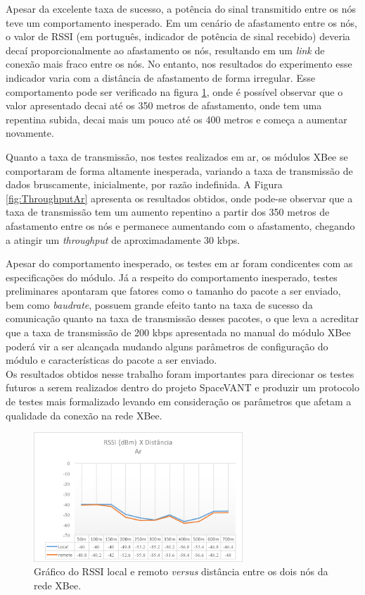 Apesar da excelente taxa de sucesso, a potência do sinal transmitido entre os nós teve um comportamento inesperado. Em um cenário de afastamento entre os nós, o valor de RSSI (em português, indicador de potência de sinal recebido) deveria decaí proporcionalmente ao afastamento os nós, resultando em um \emph{link} de conexão mais fraco entre os nós. No entanto, nos resultados do experimento esse indicador varia com a distância de afastamento de forma irregular. Esse comportamento pode ser verificado na figura \ref{fig:RangeChao}, onde é possível observar que o valor apresentado decai até os 350 metros de afastamento, onde tem uma repentina subida, decai mais um pouco até os 400 metros e começa a aumentar novamente. 

Quanto a taxa de transmissão, nos testes realizados em ar, os módulos XBee se comportaram de forma altamente inesperada, variando a taxa de transmissão de dados bruscamente, inicialmente, por razão indefinida. A Figura \ref{fig:ThroughputAr} apresenta os resultados obtidos, onde pode-se observar que a taxa de transmissão tem um aumento repentino a partir dos 350 metros de afastamento entre os nós e permanece aumentando com o afastamento, chegando a atingir um \emph{throughput} de aproximadamente 30 kbps.

Apesar do comportamento inesperado, os testes em ar foram condicentes com as especificações do módulo. Já a respeito do comportamento inesperado, testes preliminares apontaram que fatores como o tamanho do pacote a ser enviado, bem como \emph{baudrate}, possuem grande efeito tanto na taxa de sucesso da comunicação quanto na taxa de transmissão desses pacotes, o que leva a acreditar que a taxa de transmissão de 200 kbps apresentada no manual do módulo XBee poderá vir a ser alcançada mudando alguns parâmetros de configuração do módulo e características do pacote a ser enviado.\\

Os resultados obtidos nesse trabalho foram importantes para direcionar os testes futuros a serem realizados dentro do projeto SpaceVANT e produzir um protocolo de testes mais formalizado levando em consideração os parâmetros que afetam a qualidade da conexão na rede XBee.   

\begin{figure} 
\center
\includegraphics[width=0.7\textwidth]{rangeResultAr.png}
\caption{Gráfico do RSSI local e remoto \emph{versus} distância entre os dois nós da rede XBee.} 
\label{fig:RangeChao}
\end{figure}

